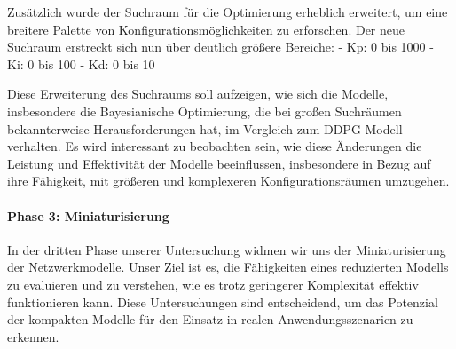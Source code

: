 Zusätzlich wurde der Suchraum für die Optimierung erheblich erweitert, um eine breitere Palette von Konfigurationsmöglichkeiten zu erforschen. Der neue Suchraum erstreckt sich nun über deutlich größere Bereiche:
- Kp: 0 bis 1000
- Ki: 0 bis 100
- Kd: 0 bis 10

Diese Erweiterung des Suchraums soll aufzeigen, wie sich die Modelle, insbesondere die Bayesianische Optimierung, die bei großen Suchräumen bekannterweise Herausforderungen hat, im Vergleich zum DDPG-Modell verhalten. Es wird interessant zu beobachten sein, wie diese Änderungen die Leistung und Effektivität der Modelle beeinflussen, insbesondere in Bezug auf ihre Fähigkeit, mit größeren und komplexeren Konfigurationsräumen umzugehen.

\paragraph{Phase 3: Miniaturisierung}

In der dritten Phase unserer Untersuchung widmen wir uns der Miniaturisierung der Netzwerkmodelle. Unser Ziel ist es, die Fähigkeiten eines reduzierten Modells zu evaluieren und zu verstehen, wie es trotz geringerer Komplexität effektiv funktionieren kann. Diese Untersuchungen sind entscheidend, um das Potenzial der kompakten Modelle für den Einsatz in realen Anwendungsszenarien zu erkennen.







